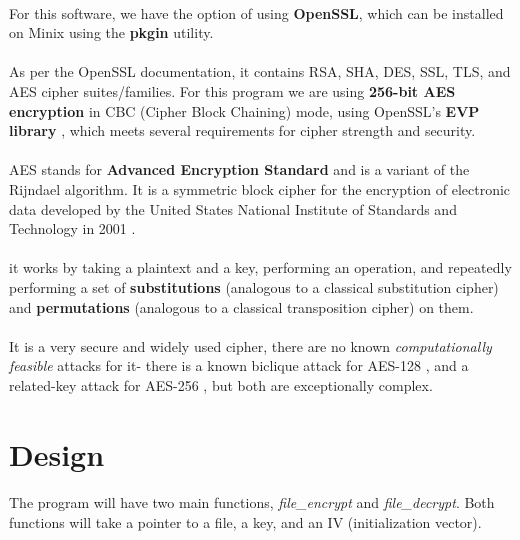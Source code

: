 \documentclass{article}
\begin{document}
    \paragraph{}For this software, we have the option of using \textbf{OpenSSL}, which can be installed on Minix using the \textbf{pkgin} utility.
    
    \paragraph{}As per the OpenSSL documentation, it contains RSA, SHA, DES, SSL, TLS, and AES cipher suites/families. For this program we are using \textbf{256-bit AES encryption} in CBC (Cipher Block Chaining) mode, using OpenSSL's \textbf{EVP library} \parencite{openssl_evp}, which meets several  requirements for cipher strength and security.

    \paragraph{}AES stands for \textbf{Advanced Encryption Standard} and is a variant of the Rijndael algorithm. It is a symmetric block cipher for the encryption of electronic data developed by the United States National Institute of Standards and Technology in 2001 \parencite{aes_256_nist}.
    \paragraph{}it works by taking a plaintext and a key, performing an operation, and repeatedly performing a set of \textbf{substitutions} (analogous to a classical substitution cipher) and \textbf{permutations} (analogous to a classical transposition cipher) on them.
    \paragraph{}It is a very secure and widely used cipher, there are no known \textit{computationally feasible} attacks for it- there is a known biclique attack for AES-128 \parencite{aes_attack}, and a related-key attack for AES-256 \parencite{aes_256_attack} \parencite{aes_256_attack_2}, but both are exceptionally complex.
    

\section{Design}
    \paragraph{}The program will have two main functions, \textit{file\_encrypt} and \textit{file\_decrypt}. Both functions will take a pointer to a file, a key, and an IV (initialization vector).
\end{document}
